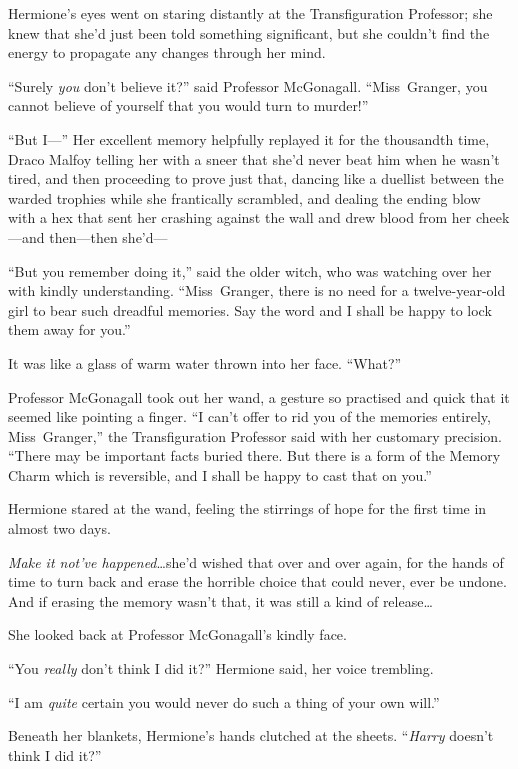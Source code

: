 Hermione’s eyes went on staring distantly at the Transfiguration Professor; she knew that she’d just been told something significant, but she couldn’t find the energy to propagate any changes through her mind.

“Surely \emph{you} don’t believe it?” said Professor McGonagall. “Miss~Granger, you cannot believe of yourself that you would turn to murder!”

“But I—” Her excellent memory helpfully replayed it for the thousandth time, Draco Malfoy telling her with a sneer that she’d never beat him when he wasn’t tired, and then proceeding to prove just that, dancing like a duellist between the warded trophies while she frantically scrambled, and dealing the ending blow with a hex that sent her crashing against the wall and drew blood from her cheek—and then—then she’d—

“But you remember doing it,” said the older witch, who was watching over her with kindly understanding. “Miss~Granger, there is no need for a twelve-year-old girl to bear such dreadful memories. Say the word and I shall be happy to lock them away for you.”

It was like a glass of warm water thrown into her face. “What?”

Professor McGonagall took out her wand, a gesture so practised and quick that it seemed like pointing a finger. “I can’t offer to rid you of the memories entirely, Miss~Granger,” the Transfiguration Professor said with her customary precision. “There may be important facts buried there. But there is a form of the Memory Charm which is reversible, and I shall be happy to cast that on you.”

Hermione stared at the wand, feeling the stirrings of hope for the first time in almost two days.

\emph{Make it not’ve happened}…she’d wished that over and over again, for the hands of time to turn back and erase the horrible choice that could never, ever be undone. And if erasing the memory wasn’t that, it was still a kind of release…

She looked back at Professor McGonagall’s kindly face.

“You \emph{really} don’t think I did it?” Hermione said, her voice trembling.

“I am \emph{quite} certain you would never do such a thing of your own will.”

Beneath her blankets, Hermione’s hands clutched at the sheets. “\emph{Harry} doesn’t think I did it?”

